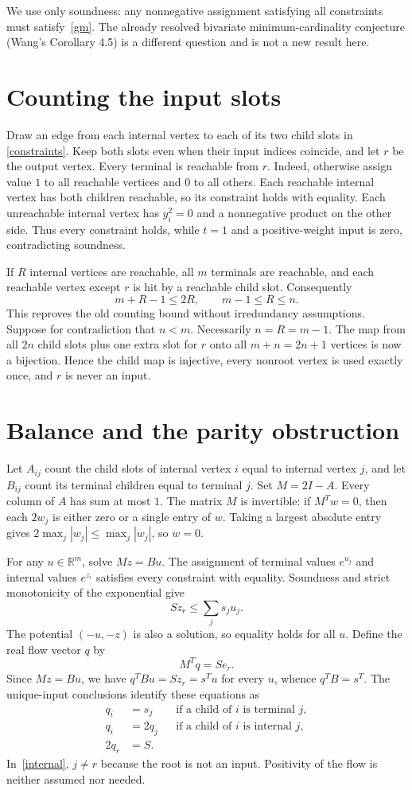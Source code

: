 \documentclass[11pt]{article}
\newcommand{\R}{\mathbb R}
\begin{document}
We use only soundness: any nonnegative assignment satisfying all
constraints must satisfy~\eqref{gm}. The already resolved bivariate
minimum-cardinality conjecture (Wang's Corollary 4.5) is a different
question and is not a new result here.

\section{Counting the input slots}
Draw an edge from each internal vertex to each of its two child slots in
\eqref{constraints}. Keep both slots even when their input indices coincide,
and let $r$ be the output vertex. Every terminal is reachable from $r$.
Indeed, otherwise assign value $1$ to all reachable vertices and $0$ to
all others. Each reachable internal vertex has both children reachable,
so its constraint holds with equality. Each unreachable internal vertex
has $y_i^2=0$ and a nonnegative product on the other side.
Thus every constraint holds, while $t=1$ and a positive-weight input is
zero, contradicting soundness.

If $R$ internal vertices are reachable, all $m$ terminals are reachable,
and each reachable vertex except $r$ is hit by a reachable child slot.
Consequently
\[
 m+R-1\le 2R,\qquad m-1\le R\le n.
\]
This reproves the old counting bound without irredundancy assumptions.
Suppose for contradiction that $n<m$. Necessarily $n=R=m-1$.
The map from all $2n$ child slots plus one extra slot for $r$ onto all
$m+n=2n+1$ vertices is now a bijection. Hence the child map is injective,
every nonroot vertex is used exactly once, and $r$ is never an input.

\section{Balance and the parity obstruction}
Let $A_{ij}$ count the child slots of internal vertex $i$ equal to internal
vertex $j$, and let $B_{ij}$ count its terminal children equal to terminal
$j$. Set $M=2I-A$. Every column of $A$ has sum at most $1$.
The matrix $M$ is invertible: if $M^T w=0$, then each $2w_j$ is either
zero or a single entry of $w$. Taking a largest absolute entry gives
$2\max_j|w_j|\le\max_j|w_j|$, so $w=0$.

For any $u\in\R^m$, solve $Mz=Bu$. The assignment of terminal values
$e^{u_j}$ and internal values $e^{z_i}$ satisfies every constraint with
equality. Soundness and strict monotonicity of the exponential give
\[
 S z_r\le\sum_j s_j u_j.
\]
The potential $(-u,-z)$ is also a solution, so equality holds for all $u$.
Define the real flow vector $q$ by
\[
 M^Tq=Se_r.
\]
Since $Mz=Bu$, we have $q^TBu=Sz_r=s^Tu$ for every $u$, whence
$q^TB=s^T$. The unique-input conclusions identify these equations as
\begin{align}
 q_i&=s_j &&\text{if a child of $i$ is terminal $j$},\label{leaf}\\
 q_i&=2q_j &&\text{if a child of $i$ is internal $j$},\label{internal}\\
 2q_r&=S.\label{root}
\end{align}
In~\eqref{internal}, $j\ne r$ because the root is not an input. Positivity
of the flow is neither assumed nor needed.
\end{document}
